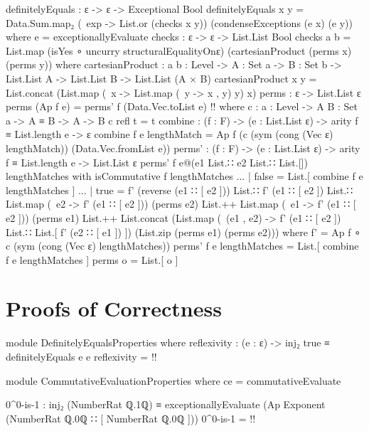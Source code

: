 \documentclass{report}
\begin{document}
\begin{code}
definitelyEquals : ε -> ε -> Exceptional Bool
definitelyEquals x y = Data.Sum.map₂ (\ exp -> List.or (checks x y))
                                     (condenseExceptions (e x) (e y))
  where
  e = exceptionallyEvaluate
  checks : ε -> ε -> List.List Bool
  checks a b = List.map (isYes ∘ uncurry structuralEqualityOnε)
                        (cartesianProduct (perms x) (perms y))
    where
    cartesianProduct : {a b : Level} ->
                       {A : Set a} ->
                       {B : Set b} ->
                       List.List A ->
                       List.List B ->
                       List.List (A × B)
    cartesianProduct x y =
      List.concat (List.map (\ x -> List.map (\ y -> x , y) y) x)
    perms : ε -> List.List ε
    perms (Ap f e) = perms' f (Data.Vec.toList e) {!!}
      where
      c : {a : Level} ->
          {A B : Set a} ->
          A ≡ B ->
          A -> B
      c refl t = t
      combine : (f : F) -> (e : List.List ε) -> arity f ≡ List.length e -> ε
      combine f e lengthMatch = Ap f (c (sym (cong (Vec ε) lengthMatch))
                                        (Data.Vec.fromList e))
      perms' : (f : F) -> (e : List.List ε) -> arity f ≡ List.length e -> List.List ε
      perms' f e@(e1 List.∷ e2 List.∷ List.[]) lengthMatches with isCommutative f lengthMatches
      ... | false = List.[ combine f e lengthMatches ]
      ... | true =
        f' (reverse (e1 ∷ [ e2 ])) List.∷ f' (e1 ∷ [ e2 ]) List.∷
        List.map (\ e2 -> f' (e1 ∷ [ e2 ])) (perms e2) List.++
        List.map (\ e1 -> f' (e1 ∷ [ e2 ])) (perms e1) List.++
        List.concat (List.map (\ (e1 , e2) -> f' (e1 ∷ [ e2 ]) List.∷
                                              List.[ f' (e2 ∷ [ e1 ]) ])
                              (List.zip (perms e1) (perms e2)))
        where
        f' = Ap f ∘ c (sym (cong (Vec ε) lengthMatches))
      perms' f e lengthMatches = List.[ combine f e lengthMatches ]
    perms o = List.[ o ]
\end{code}

\chapter{Proofs of Correctness}

\begin{code}
module DefinitelyEqualsProperties where
  reflexivity : (e : ε) -> inj₂ true ≡ definitelyEquals e e
  reflexivity = {!!}

module CommutativeEvaluationProperties where
  ce = commutativeEvaluate

  0^0-is-1 :
    inj₂ (NumberRat ℚ.1ℚ) ≡
      exceptionallyEvaluate (Ap Exponent (NumberRat ℚ.0ℚ ∷ [ NumberRat ℚ.0ℚ ]))
  0^0-is-1 = {!!}
\end{code}
\end{document}
